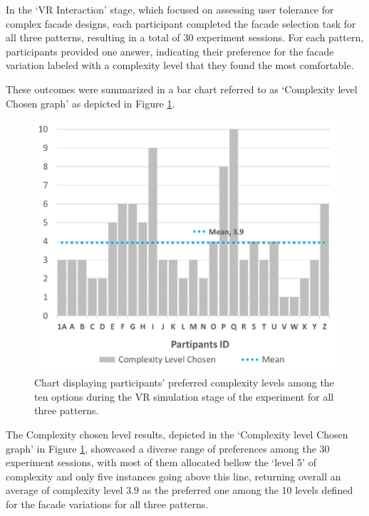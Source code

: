 In the `VR Interaction' stage, which focused on assessing user tolerance for complex facade designs, each participant completed the facade selection task for all three patterns, resulting in a total of 30 experiment sessions.
For each pattern, participants provided one answer, indicating their preference for the facade variation labeled with a complexity level that they found the most comfortable.

These outcomes were summarized in a bar chart referred to as `Complexity level Chosen graph' as depicted in Figure \ref{fig:ComplexityLevelChosenChart}.

    \begin{figure}[htb]
        \centering
        \includegraphics[width=\linewidth]{Images/ComplexityLevelChosenChart}
        \caption{Chart displaying participants' preferred complexity levels among the ten options during the VR simulation stage of the experiment for all three patterns.}
        \label{fig:ComplexityLevelChosenChart}
    \end{figure}

The Complexity chosen level results, depicted in the `Complexity level Chosen graph' in Figure \ref{fig:ComplexityLevelChosenChart}, showcased a diverse range of preferences among the 30 experiment sessions, with most of them allocated bellow the `level 5' of complexity and only five instances going above this line, returning overall an average of  complexity level \(3.9\) as the preferred one among the 10 levels defined for the facade variations for all three patterns.

